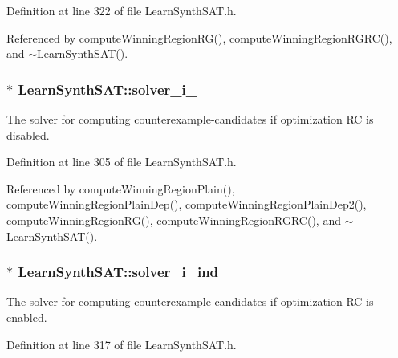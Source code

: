 Definition at line 322 of file Learn\-Synth\-S\-A\-T.\-h.



Referenced by compute\-Winning\-Region\-R\-G(), compute\-Winning\-Region\-R\-G\-R\-C(), and $\sim$\-Learn\-Synth\-S\-A\-T().

\hypertarget{classLearnSynthSAT_a97e5c03d47cb7f237104472972b12c1c}{
\subsubsection[{solver\-\_\-i\-\_\-}]{$\ast$ Learn\-Synth\-S\-A\-T\-::solver\-\_\-i\-\_\-\hspace{0.3cm}{\ttfamily [protected]}}}\label{classLearnSynthSAT_a97e5c03d47cb7f237104472972b12c1c}


The solver for computing counterexample-\/candidates if optimization R\-C is disabled. 



Definition at line 305 of file Learn\-Synth\-S\-A\-T.\-h.



Referenced by compute\-Winning\-Region\-Plain(), compute\-Winning\-Region\-Plain\-Dep(), compute\-Winning\-Region\-Plain\-Dep2(), compute\-Winning\-Region\-R\-G(), compute\-Winning\-Region\-R\-G\-R\-C(), and $\sim$\-Learn\-Synth\-S\-A\-T().

\hypertarget{classLearnSynthSAT_ae7f4a4e3546f46ad1256e203311226cf}{
\subsubsection[{solver\-\_\-i\-\_\-ind\-\_\-}]{$\ast$ Learn\-Synth\-S\-A\-T\-::solver\-\_\-i\-\_\-ind\-\_\-\hspace{0.3cm}{\ttfamily [protected]}}}\label{classLearnSynthSAT_ae7f4a4e3546f46ad1256e203311226cf}


The solver for computing counterexample-\/candidates if optimization R\-C is enabled. 



Definition at line 317 of file Learn\-Synth\-S\-A\-T.\-h.



